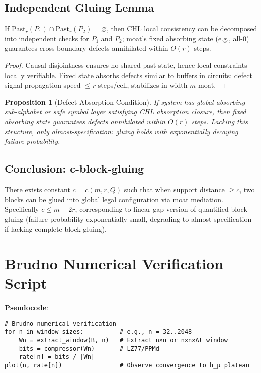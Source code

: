 \documentclass[12pt]{article}
\theoremstyle{plain}
\newtheorem{proposition}[theorem]{Proposition}
\theoremstyle{definition}
\begin{document}
\subsection{Independent Gluing Lemma}

If $\mathrm{Past}_r(P_1) \cap \mathrm{Past}_r(P_2) = \varnothing$, then CHL local consistency can be decomposed into independent checks for $P_1$ and $P_2$; moat's fixed absorbing state (e.g., all-0) guarantees cross-boundary defects annihilated within $O(r)$ steps.

\begin{proof}
Causal disjointness ensures no shared past state, hence local constraints locally verifiable. Fixed state absorbs defects similar to buffers in circuits: defect signal propagation speed $\le r$ steps/cell, stabilizes in width $m$ moat.
\end{proof}

\begin{proposition}[Defect Absorption Condition]
If system has global absorbing sub-alphabet or safe symbol layer satisfying CHL absorption closure, then fixed absorbing state guarantees defects annihilated within $O(r)$ steps. Lacking this structure, only almost-specification: gluing holds with exponentially decaying failure probability.
\end{proposition}

\subsection{Conclusion: c-block-gluing}

There exists constant $c = c(m, r, Q)$ such that when support distance $\ge c$, two blocks can be glued into global legal configuration via moat mediation. Specifically $c \le m + 2r$, corresponding to linear-gap version of quantified block-gluing (failure probability exponentially small, degrading to almost-specification if lacking complete block-gluing).

\section{Brudno Numerical Verification Script}

\textbf{Pseudocode}:

\begin{verbatim}
# Brudno numerical verification
for n in window_sizes:          # e.g., n = 32..2048
    Wn = extract_window(B, n)   # Extract n×n or n×n×Δt window
    bits = compressor(Wn)       # LZ77/PPMd
    rate[n] = bits / |Wn|
plot(n, rate[n])                # Observe convergence to h_μ plateau
\end{verbatim}
\end{document}
